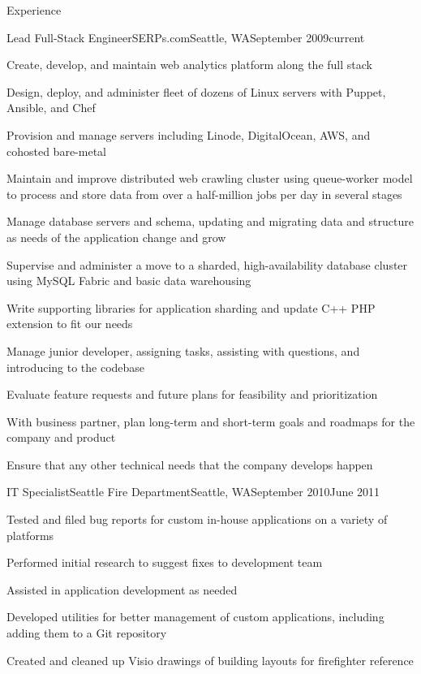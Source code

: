 \documentclass[letterpaper,10pt]{article}
\newcommand{\optarg}[2][]{%
  \ifthenelse{\isempty{#1}}%
    {}%
    {#2}%
}
\newenvironment{res_section}[1]{%
  \vskip 6pt
  \noindent
  {\Large \textbf{#1}}\\
  \rule[8pt]{\textwidth}{0.5pt}
  \vskip -8pt
}{
}
\newenvironment{res_subsection}[1]{%
  \vskip 4pt
  \noindent
  \textbf{\large{#1}}
  \begin{itemize}
}{
  \end{itemize}
}
\newenvironment{res_experienceitem}[5]{%
  \begin{res_subsection}{#1 - \em{%
  #2%
  \optarg[#3]{, #3}%
  \optarg[#4]{, #4}%
  \optarg[#5]{ -- #5}%
  }}
}{
  \end{res_subsection}
}
\begin{document}
\begin{res_section}{Experience}
\begin{res_experienceitem}{Lead Full-Stack Engineer}{SERPs.com}{Seattle, WA}{September 2009}{current}
  \item Create, develop, and maintain web analytics platform along the full stack
  \item Design, deploy, and administer fleet of dozens of Linux servers with Puppet, Ansible, and Chef
  \item Provision and manage servers including Linode, DigitalOcean, AWS, and cohosted bare-metal
  \item Maintain and improve distributed web crawling cluster using queue-worker model to process and store data from over a half-million jobs per day in several stages
  \item Manage database servers and schema, updating and migrating data and structure as needs of the application change and grow
  \item Supervise and administer a move to a sharded, high-availability database cluster using MySQL Fabric and basic data warehousing
  \item Write supporting libraries for application sharding and update C++ PHP extension to fit our needs
  \item Manage junior developer, assigning tasks, assisting with questions, and introducing to the codebase
  \item Evaluate feature requests and future plans for feasibility and prioritization
  \item With business partner, plan long-term and short-term goals and roadmaps for the company and product
  \item Ensure that any other technical needs that the company develops happen
\end{res_experienceitem}
\begin{res_experienceitem}{IT Specialist}{Seattle Fire Department}{Seattle, WA}{September 2010}{June 2011}
  \item Tested and filed bug reports for custom in-house applications on a variety of platforms
  \item Performed initial research to suggest fixes to development team
  \item Assisted in application development as needed
  \item Developed utilities for better management of custom applications, including adding them to a Git repository
  \item Created and cleaned up Visio drawings of building layouts for firefighter reference

\end{res_experienceitem}
\end{res_section}
\end{document}
